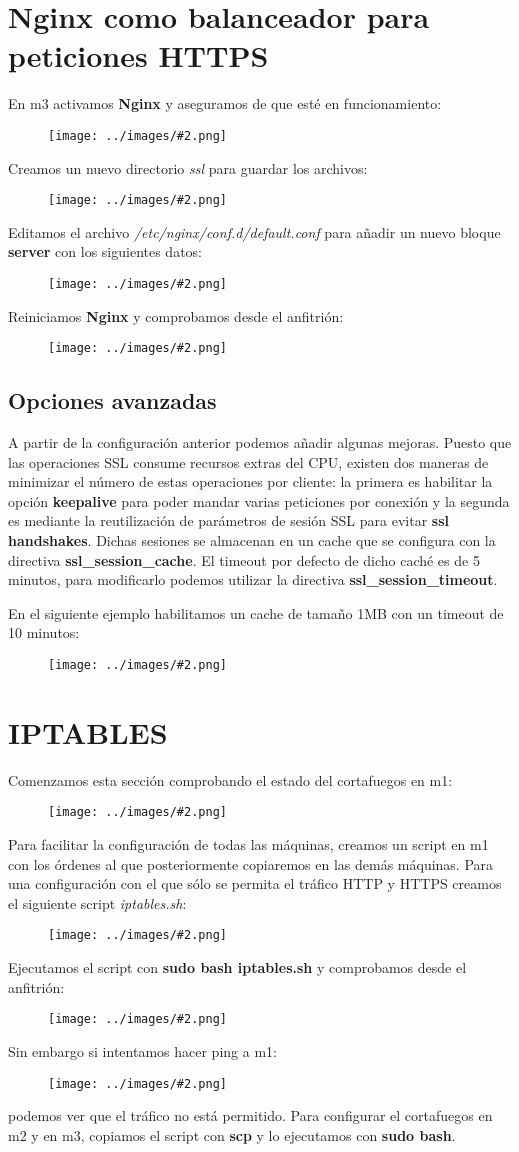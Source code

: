 \documentclass[twoside]{article}
\newcommand{\image}[2]{
\begin{figure}[H]
    \texttt{[image: ../images/\#2.png]}
    \centering
\end{figure}
}
\begin{document}
\section{Nginx como balanceador para peticiones HTTPS}
En m3 activamos \textbf{Nginx} y aseguramos de que esté en funcionamiento:
\image{8}{15}
Creamos un nuevo directorio \textit{ssl} para guardar los archivos:
\image{8}{16}
Editamos el archivo \textit{/etc/nginx/conf.d/default.conf} para añadir un nuevo bloque \textbf{server} con los siguientes datos:
\image{8}{17}
Reiniciamos \textbf{Nginx} y comprobamos desde el anfitrión:
\image{8}{18}

\subsection{Opciones avanzadas}
A partir de la configuración anterior podemos añadir algunas mejoras. Puesto que las operaciones SSL consume recursos extras del CPU, existen dos maneras de minimizar el número de estas operaciones por cliente: la primera es habilitar la opción \textbf{keepalive} para poder mandar varias peticiones por conexión y la segunda es mediante la reutilización de parámetros de sesión SSL para evitar \textbf{ssl handshakes}. Dichas sesiones se almacenan en un cache que se configura con la directiva \textbf{ssl\_session\_cache}. El timeout por defecto de dicho caché es de 5 minutos, para modificarlo podemos utilizar la directiva \textbf{ssl\_session\_timeout}.

En el siguiente ejemplo habilitamos un cache de tamaño 1MB con un timeout de 10 minutos:
\image{8}{19}

\section{IPTABLES}
Comenzamos esta sección comprobando el estado del cortafuegos en m1:
\image{8}{20}
Para facilitar la configuración de todas las máquinas, creamos un script en m1 con los órdenes al que posteriormente copiaremos en las demás máquinas. Para una configuración con el que sólo se permita el tráfico HTTP y HTTPS creamos el siguiente script \textit{iptables.sh}:
\image{8}{21}
Ejecutamos el script con \textbf{sudo bash iptables.sh} y comprobamos desde el anfitrión:
\image{8}{22}
Sin embargo si intentamos hacer ping a m1:
\image{8}{23}
podemos ver que el tráfico no está permitido. Para configurar el cortafuegos en m2 y en m3, copiamos el script con \textbf{scp} y lo ejecutamos con \textbf{sudo bash}.
\end{document}
